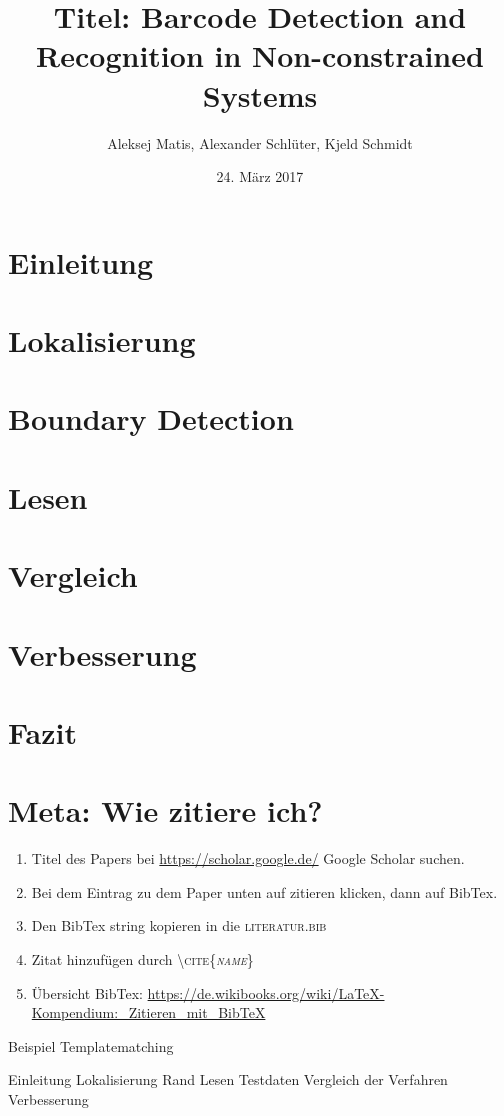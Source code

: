 \documentclass[12pt,a4paper]{article}
\author{Aleksej Matis, Alexander Schlüter, Kjeld Schmidt}
\title{Titel: Barcode Detection and Recognition in Non-constrained Systems}
\date{24. März 2017}
\begin{document}

\setcounter{page}{0}
\maketitle
\thispagestyle{empty} 
\tableofcontents
\newpage
\section{Einleitung} 

\newpage

\section{Lokalisierung} 

\newpage

\section{Boundary Detection} 

\newpage

\section{Lesen} 
 
\newpage

\section{Vergleich} 

\newpage

\section{Verbesserung} 

\newpage

\section{Fazit} 

\newpage


\section{Meta: Wie zitiere ich?} 
\begin{enumerate}
\item Titel des Papers bei \url{https://scholar.google.de/} Google Scholar suchen.
\item Bei dem Eintrag zu dem Paper unten auf zitieren klicken, dann auf BibTex.
\item Den BibTex string kopieren in die \textsc{literatur.bib}
\item Zitat hinzufügen durch \textsc{\textbackslash cite\{\textit{name}\}}
\item Übersicht BibTex: \url{https://de.wikibooks.org/wiki/LaTeX-Kompendium:_Zitieren_mit_BibTeX}
\end{enumerate}
Beispiel Templatematching \cite{chen2014scanning}
%

Einleitung
Lokalisierung
Rand
Lesen
Testdaten
Vergleich der Verfahren
Verbesserung



%

\newpage
\appendix
\printbibliography
\end{document}
